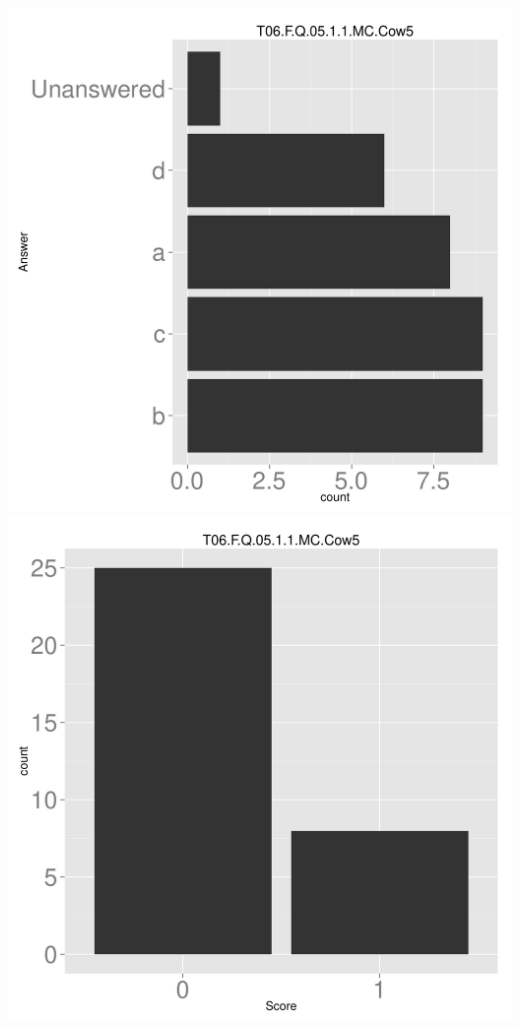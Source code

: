 \documentclass[12pt,nohyper]{tufte-handout}\usepackage[]{graphicx}\usepackage[]{color}
\begin{document}
\begin{center} \includegraphics[width=.45\linewidth]{Topic06_69_answer} \includegraphics[width=.45\linewidth]{Topic06_69_score} \end{center} 
\end{document}
